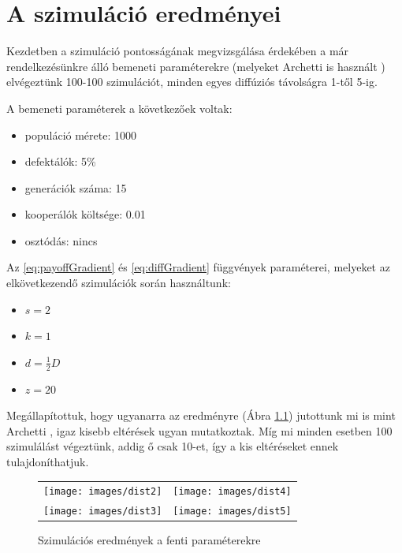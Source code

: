 
\chapter{A szimuláció eredményei}

Kezdetben a szimuláció pontosságának megvizsgálása érdekében a már rendelkezésünkre álló bemeneti paraméterekre (melyeket Archetti is használt \cite{archetti2016cooperation}) elvégeztünk 100-100 szimulációt, minden egyes diffúziós távolságra 1-től 5-ig.

\begin{multicols}{2}
	A bemeneti paraméterek a következőek voltak:
	\begin{itemize}[noitemsep]
		\item populáció mérete: 1000
		\item defektálók: 5\%
		\item generációk száma: 15
		\item kooperálók költsége: 0.01
		\item osztódás: nincs
	\end{itemize}
	Az \eqref{eq:payoffGradient} és \eqref{eq:diffGradient} függvények paraméterei, melyeket az elkövetkezendő szimulációk során használtunk:
	\begin{itemize}[noitemsep]
		\item $s = 2$
		\item $k = 1$
		\item $d = \frac{1}{2}D$
		\item $z = 20$
	\end{itemize}	
\end{multicols}

Megállapítottuk, hogy ugyanarra az eredményre (Ábra \ref{fig:DistChange}) jutottunk mi is mint Archetti \cite{archetti2016cooperation}, igaz kisebb eltérések ugyan mutatkoztak. Míg mi minden esetben 100 szimulálást végeztünk, addig ő csak 10-et, így a kis eltéréseket ennek tulajdoníthatjuk.

\begin{figure}[h]
	\centering
	\begin{tabular}{cc}
		\texttt{[image: images/dist2]}
		&
		\texttt{[image: images/dist4]}
		\\
		\texttt{[image: images/dist3]}
		&
		\texttt{[image: images/dist5]}
		\\
	\end{tabular}
	\caption{Szimulációs eredmények a fenti paraméterekre}
	\label{fig:DistChange}
\end{figure}

